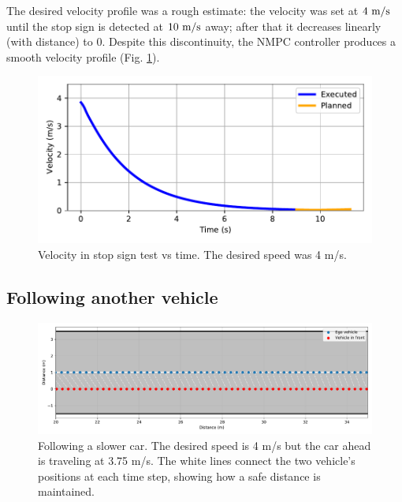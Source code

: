 \documentclass[letterpaper, 10 pt, conference]{ieeeconf}  %
\begin{document}
The desired velocity profile was a rough estimate: the velocity was set at $4\ \text{m}/\text{s}$ until the stop sign is detected at $10\ \text{m}/\text{s}$ away; after that it decreases linearly (with distance) to 0. Despite this discontinuity, the NMPC controller produces a smooth velocity profile (Fig. \ref{fig:stop_sign_velocity}).
 
 \begin{figure}[h!]
 	\centering
 	\includegraphics[width=0.8\linewidth]{figures/stop_sign_velocity.pdf}
 	\caption{Velocity in stop sign test vs time. The desired speed was 4 m/s.} 	 	\label{fig:stop_sign_velocity}
 \end{figure}
 
  \subsection{Following another vehicle}
 
 
 \begin{figure}[h!]
 	\centering
 	\includegraphics[width=1.0\linewidth]{figures/vehicle_following.pdf}
 	\caption{Following a slower car. The desired speed is 4 m/s but the car ahead is traveling at 3.75 m/s. The white lines connect the two vehicle's positions at each time step, showing how a safe distance is maintained.}
        \label{fig:vehicle_following}
 \end{figure}
 
\end{document}

